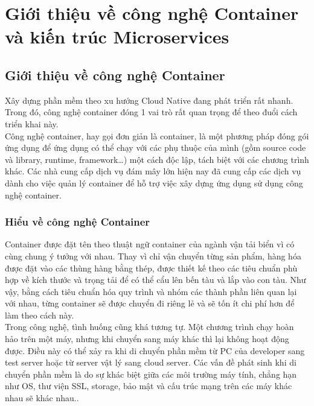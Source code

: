 \documentclass[12pt,a4paper]{report}
\begin{document}
	
\tableofcontents
{}
\listoffigures


\chapter{Giới thiệu về công nghệ Container và kiến trúc Microservices}
\setcounter{page}{1}
	\section{Giới thiệu về công nghệ Container}
		\smallskip
		\hspace{0.6cm}Xây dựng phần mềm theo xu hướng Cloud Native đang phát triển rất nhanh. Trong đó, công nghệ container đóng 1 vai trò rất quan trọng để theo đuổi cách triển khai này.\\
			
		Công nghệ container, hay gọi đơn giản là container, là một phương pháp đóng gói ứng dụng để ứng dụng có thể chạy với các phụ thuộc của mình (gồm source code và library, runtime, framework…) một cách độc lập, tách biệt với các chương trình khác. Các nhà cung cấp dịch vụ đám mây lớn hiện nay đã cung cấp các dịch vụ dành cho việc quản lý container để hỗ trợ việc xây dựng ứng dụng sử dụng công nghệ container.
			\subsection{Hiểu về công nghệ Container}
		\hspace{0.6cm}Container được đặt tên theo thuật ngữ container của ngành vận tải biển vì có cùng chung ý tưởng với nhau. Thay vì chỉ vận chuyển từng sản phẩm, hàng hóa được đặt vào các thùng hàng bằng thép, được thiết kế theo các tiêu chuẩn phù hợp về kích thước và trọng tải để có thể cẩu lên bến tàu và lắp vào con tàu. Như vậy, bằng cách tiêu chuẩn hóa quy trình và nhóm các thành phần liên quan lại với nhau, từng container sẽ được chuyển đi riêng lẻ và sẽ tốn ít chi phí hơn để làm theo cách này.\\
		
		Trong công nghệ, tình huống cũng khá tương tự. Một chương trình chạy hoàn hảo trên một máy, nhưng khi chuyển sang máy khác thì lại không hoạt động được. Điều này có thể xảy ra khi di chuyển phần mềm từ PC của developer sang test server hoặc từ server vật lý sang cloud server. Các vấn đề phát sinh khi di chuyển phần mềm là do sự khác biệt giữa các môi trường máy tính, chẳng hạn như OS, thư viện SSL, storage, bảo mật và cấu trúc mạng trên các máy khác nhau sẽ khác nhau..\\
		
\end{document}
